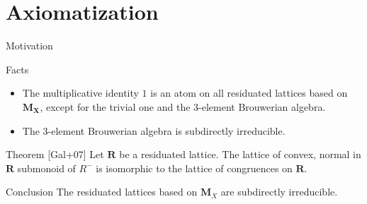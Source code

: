 \documentclass[professionalfont, handout, 10pt]{beamer} %
\theoremstyle{plain}
\theoremstyle{definition}
\newcommand{\m}[1]{{\mathbf {#1} }}
\begin{document}
\section{Axiomatization}

\begin{frame}{Motivation}

\begin{block}{Facts}
    \begin{itemize}
        \item The multiplicative identity $1$ is an atom on all residuated lattices based on $\mathbf{M_X}$, except for the trivial one and the $3$-element Brouwerian algebra.

        \item The $3$-element Brouwerian algebra is subdirectly irreducible.
    \end{itemize}
\end{block}

\begin{block}{Theorem [Gal+07]}
    Let $\m R$ be a residuated lattice.
    The lattice of convex, normal in $\m R$ submonoid of $R^-$ is isomorphic to the lattice of congruences on $\m R$.
\end{block}

\pause

\begin{block}{Conclusion}
    The residuated lattices based on $\m M_X$ are subdirectly irreducible.
\end{block}
\end{frame}
\end{document}
